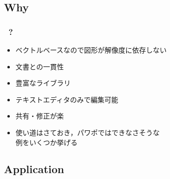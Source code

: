 \documentclass[./main]{subfiles}
\begin{document}
\subsection{Why}
\begin{frame}
  \frametitle{\subsecname\ \secname ?}

  \centering

  \vfilll

  \begin{itemize}
    \item ベクトルベースなので図形が解像度に依存しない
    \item 文書との一貫性
    \item 豊富なライブラリ
    \item テキストエディタのみで編集可能
    \item 共有・修正が楽
  \end{itemize}

  \vfilll

  \begin{itemize}
    \item 使い道はさておき，パワポではできなさそうな\\ 例をいくつか挙げる
  \end{itemize}

  \vfilll

\end{frame}





\subsection{Application}

\newcommand{\drawClock}[2]{%
  \begin{tikzpicture}
    \draw[very thick] (0,0) circle (2cm);%
    \draw[fill] (0,0) circle (0.1cm);%
    \foreach \angle / \label in {0/3, 30/2, 60/1, 90/12, 120/11, 150/10, 180/9, 210/8, 240/7, 270/6, 300/5, 330/4} { 
      \draw (\angle:1.8cm) -- (\angle:2cm); 
      \node at (\angle:1.5cm) {\textsf{\label}}; 
    } 
    \foreach \angle in {0,90,180,270} 
       \draw[thick] (\angle:1.7cm) -- (\angle:2cm); 
    \draw[line width=3pt, cap=round] (0,0) -- ($(-#1*30-#2*0.5+90:0.8cm)$);%
    \draw[line width=3pt, cap=round] (0,0) -- ($(-#2*6+90:1.2cm)$);%
  \end{tikzpicture}%
}
\end{document}
